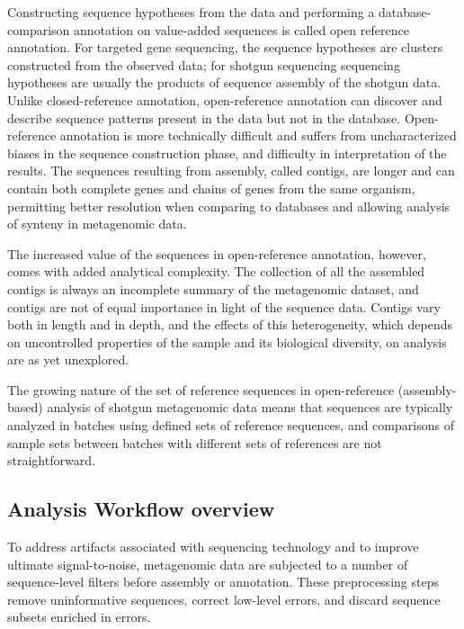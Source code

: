 \documentclass[graybox]{svmult}
\begin{document}

Constructing sequence hypotheses from the data and performing a database-comparison annotation on value-added sequences is called open reference annotation.   For targeted gene sequencing, the sequence hypotheses are clusters constructed from the observed data; for shotgun sequencing sequencing hypotheses are usually the products of sequence assembly of the shotgun data.   Unlike closed-reference annotation, open-reference annotation can discover and describe sequence patterns present in the data but not in the database.  Open-reference annotation is more technically difficult and suffers from uncharacterized biases in the sequence construction phase, and difficulty in interpretation of the results.  The sequences resulting from assembly, called contigs, are longer and can contain both complete genes and chains of genes from the same organism, permitting better resolution when comparing to databases and allowing analysis of synteny in metagenomic data.

The increased value of the sequences in open-reference annotation, however, comes with added analytical complexity.   
The collection of all the assembled contigs is always an incomplete summary of the metagenomic dataset, and contigs are not of equal importance in light of the sequence data.
Contigs vary both in length and in depth, and the effects of this heterogeneity, which depends on uncontrolled properties of the sample and its biological diversity, on analysis are as yet unexplored.

The growing nature of the set of reference sequences in open-reference (assembly-based) analysis of shotgun metagenomic data means that sequences are typically analyzed in batches using defined sets of reference sequences, and comparisons of sample sets between batches with different sets of references are not straightforward.

\subsection{Analysis Workflow overview}
        To address artifacts associated with sequencing technology and to improve ultimate signal-to-noise, metagenomic data are subjected to a number of sequence-level filters before assembly or annotation.  These preprocessing steps remove uninformative sequences, correct low-level errors, and discard sequence subsets enriched in errors.
\end{document}
